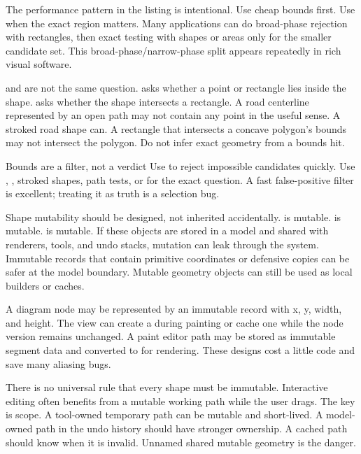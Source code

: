 The performance pattern in the listing is intentional. Use cheap bounds first. Use  when the exact region matters. Many applications can do broad-phase rejection with rectangles, then exact testing with shapes or areas only for the smaller candidate set. This broad-phase/narrow-phase split appears repeatedly in rich visual software.

 and  are not the same question.  asks whether a point or rectangle lies inside the shape.  asks whether the shape intersects a rectangle. A road centerline represented by an open path may not contain any point in the useful sense. A stroked road shape can. A rectangle that intersects a concave polygon's bounds may not intersect the polygon. Do not infer exact geometry from a bounds hit.

\begin{detailbox}{Bounds are a filter, not a verdict}
Use  to reject impossible candidates quickly. Use , , stroked shapes, path tests, or  for the exact question. A fast false-positive filter is excellent; treating it as truth is a selection bug.
\end{detailbox}

Shape mutability should be designed, not inherited accidentally.  is mutable.  is mutable.  is mutable. If these objects are stored in a model and shared with renderers, tools, and undo stacks, mutation can leak through the system. Immutable records that contain primitive coordinates or defensive copies can be safer at the model boundary. Mutable geometry objects can still be used as local builders or caches.

A diagram node may be represented by an immutable record with x, y, width, and height. The view can create a  during painting or cache one while the node version remains unchanged. A paint editor path may be stored as immutable segment data and converted to  for rendering. These designs cost a little code and save many aliasing bugs.

There is no universal rule that every shape must be immutable. Interactive editing often benefits from a mutable working path while the user drags. The key is scope. A tool-owned temporary path can be mutable and short-lived. A model-owned path in the undo history should have stronger ownership. A cached path should know when it is invalid. Unnamed shared mutable geometry is the danger.

